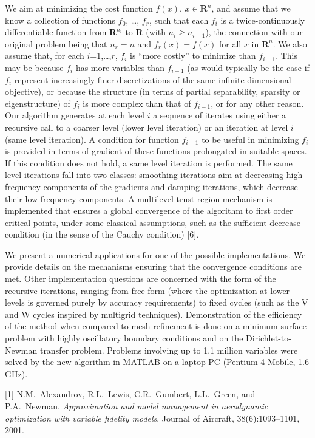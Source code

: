 \documentclass[twosided]{report}
\begin{document}
We aim at minimizing the cost function $f(x)$, $x \in \mathbf{R}^n$,
and assume that
we know a collection of functions $f_0$, \ldots, $f_r$,
such that each $f_i$ is a twice-continuously differentiable function
from $\mathbf{R}^{n_i}$ to $\mathbf{R}$ (with $n_i \ge n_{i-1}$),
the connection with our original problem being
that $n_r = n$
and $f_r(x) = f(x)$ for all $x$ in $\mathbf{R}^n$. We also assume that, for
each $i$=1,\ldots,$r$, $f_i$ is ``more costly'' to minimize than
$f_{i-1}$.
This may be because $f_i$ has more variables than
$f_{i-1}$ (as would typically be the
case if $f_i$ represent increasingly finer discretizations of the same
infinite-dimensional objective), or because the structure (in terms of
partial separability, sparsity or eigenstructure) of $f_i$ is more complex
than that of $f_{i-1}$, or for any other reason. Our algorithm generates at
each level $i$ a sequence of iterates using either a recursive call to a
coarser level (lower level iteration) or an iteration at level $i$ (same
level iteration). A condition for function $f_{i-1}$ to be useful in
minimizing $f_i$ is provided in terms of gradient of these functions
prolongated in suitable spaces. If this condition does not hold, a same
level iteration is performed. The same level iterations fall into two
classes: smoothing iterations aim at decreasing high-frequency
components of the gradients and damping iterations, which decrease
their low-frequency components. A multilevel trust region mechanism is
implemented that ensures a global convergence of the algorithm to first
order critical points, under some classical assumptions, such as the
sufficient decrease condition (in the sense of the Cauchy condition)
[6].

We present a numerical applications for one of the possible
implementations. We provide details on the mechanisms ensuring that the
convergence conditions are met. Other implementation questions are
concerned with the form of the recursive iterations, ranging from free
form (where the optimization at lower levels is governed purely by
accuracy requirements) to fixed cycles (such as the V and W cycles
inspired by multigrid techniques). Demonstration of the efficiency of
the method when compared to mesh refinement is done on a minimum
surface problem with highly oscillatory boundary conditions and on the
Dirichlet-to-Newman transfer problem. Problems involving up to 1.1
million variables were solved by the new algorithm in MATLAB on a
laptop PC (Pentium 4 Mobile, 1.6 GHz).

[1] N.M.~Alexandrov, R.L.~Lewis, C.R.~Gumbert, L.L.~Green, and
P.A.~Newman. {\em Approximation and model management in aerodynamic optimization
with variable fidelity models}. Journal of Aircraft, 38(6):1093--1101,
2001.
\end{document}
